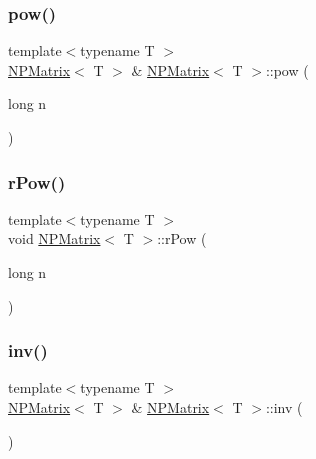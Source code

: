 \mbox{\label{class_n_p_matrix_ab131f8f10f6ab2aa9d9ca6467f0ffbf5}} 
\subsubsection{\texorpdfstring{pow()}{pow()}}
{\footnotesize\ttfamily template$<$typename T $>$ \\
\mbox{\hyperlink{class_n_p_matrix}{N\+P\+Matrix}}$<$ T $>$ \& \mbox{\hyperlink{class_n_p_matrix}{N\+P\+Matrix}}$<$ T $>$\+::pow (\begin{DoxyParamCaption}\item[{long}]{n }\end{DoxyParamCaption})\hspace{0.3cm}{\ttfamily [protected]}}

\mbox{\label{class_n_p_matrix_acd64a88eccd7644ff34a0f42e4313b09}} 
\subsubsection{\texorpdfstring{rPow()}{rPow()}}
{\footnotesize\ttfamily template$<$typename T $>$ \\
void \mbox{\hyperlink{class_n_p_matrix}{N\+P\+Matrix}}$<$ T $>$\+::r\+Pow (\begin{DoxyParamCaption}\item[{long}]{n }\end{DoxyParamCaption})\hspace{0.3cm}{\ttfamily [protected]}}

\mbox{\label{class_n_p_matrix_ac672c69c4b0ec298ac3e8326fcce48cb}} 
\subsubsection{\texorpdfstring{inv()}{inv()}}
{\footnotesize\ttfamily template$<$typename T $>$ \\
\mbox{\hyperlink{class_n_p_matrix}{N\+P\+Matrix}}$<$ T $>$ \& \mbox{\hyperlink{class_n_p_matrix}{N\+P\+Matrix}}$<$ T $>$\+::inv (\begin{DoxyParamCaption}{ }\end{DoxyParamCaption})\hspace{0.3cm}{\ttfamily [protected]}}

